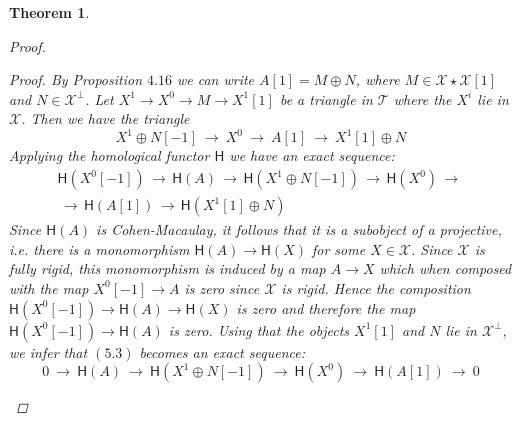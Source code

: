 \documentclass[oneside, a4paper,reqno]{amsart}
\numberwithin{equation}{section}
\newtheorem{thm}{Theorem}[section]
\theoremstyle{definition}
\begin{document}
\begin{thm}
\begin{proof}
\begin{enumerate}
{\em Proof.}  By Proposition $4.16$ we can write $A[1] = M \oplus N$, where $M\in {\mathcal X}\star {\mathcal X}[1]$ and $N \in {\mathcal X}^{\bot}$.  
Let $X^{1} {\longrightarrow} X^{0} {\longrightarrow} M {\longrightarrow} X^{1}[1]$ be a triangle in ${\mathcal T}$ where the $X^{i}$ lie in ${\mathcal X}$.  Then we have the triangle 
\[
X^{1} \oplus N[-1] \ {\longrightarrow} \ X^{0} \  {\longrightarrow} \ A[1] \ {\longrightarrow} \ X^{1}[1]\oplus N
\]
Applying the homological functor $\mathsf{H}$ we have an exact sequence:
\begin{equation}
\begin{multlined}
\mathsf{H}(X^{0}[-1]) \, {\longrightarrow} \, \mathsf{H}(A) \,  {\longrightarrow} \, \mathsf{H}(X^{1} \oplus N[-1]) \, {\longrightarrow} \, \mathsf{H}(X^{0}) \, {\longrightarrow} \, \\ \, {\longrightarrow} \, \mathsf{H}(A[1]) \, {\longrightarrow} \, \mathsf{H}(X^{1}[1] \oplus N)
\end{multlined}
\end{equation}
Since $\mathsf{H}(A)$ is Cohen-Macaulay, it follows that it is a subobject of a projective, i.e. there is a monomorphism $\mathsf{H}(A) {\longrightarrow} \mathsf{H}(X)$ for some $X \in {\mathcal X}$. Since ${\mathcal X}$ is fully rigid, this monomorphism is induced by a map $A {\longrightarrow} X$ which when composed with the map $X^{0}[-1] {\longrightarrow} A$ is zero since ${\mathcal X}$ is rigid. Hence the composition $\mathsf{H}(X^{0}[-1]) {\longrightarrow} \mathsf{H}(A) {\longrightarrow} \mathsf{H}(X)$ is zero and therefore   the map $\mathsf{H}(X^{0}[-1]) {\longrightarrow} \mathsf{H}(A)$ is zero.  Using that the objects $X^{1}[1]$ and $N$ lie in ${\mathcal X}^{\bot}$, we infer that $(5.3)$ becomes an exact sequence:
\begin{equation}
0 \ {\longrightarrow} \  \mathsf{H}(A)  \ {\longrightarrow} \ \mathsf{H}(X^{1} \oplus N[-1]) \  {\longrightarrow} \ \mathsf{H}(X^{0}) \ {\longrightarrow} \ \mathsf{H}(A[1])  \ {\longrightarrow} \ 0
\end{equation}

\end{enumerate}
\end{proof}
\end{thm}
\end{document}
